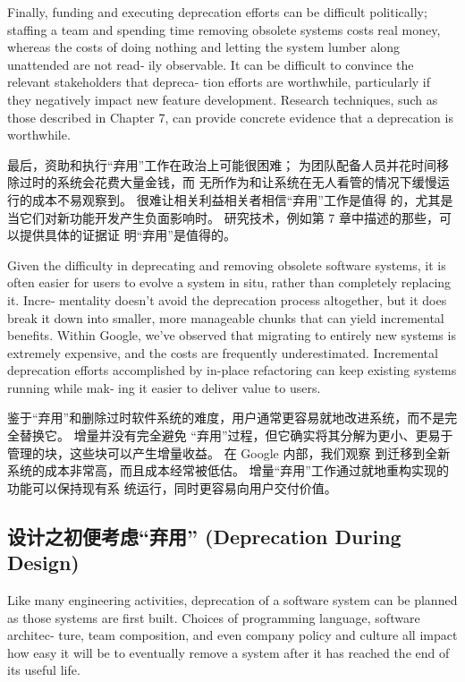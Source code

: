 \documentclass[10pt,a4paper,UTF8]{ctexart}
\begin{document}
Finally, funding and executing deprecation efforts can be difficult politically; staffing a team and
spending time removing obsolete systems costs real money, whereas the costs of doing nothing and
letting the system lumber along unattended are not read‐ ily observable. It can be difficult to
convince the relevant stakeholders that depreca‐ tion efforts are worthwhile, particularly if they
negatively impact new feature development. Research techniques, such as those described in Chapter
7, can provide concrete evidence that a deprecation is worthwhile.

最后，资助和执行“弃用”工作在政治上可能很困难； 为团队配备人员并花时间移除过时的系统会花费大量金钱，而
无所作为和让系统在无人看管的情况下缓慢运行的成本不易观察到。 很难让相关利益相关者相信“弃用”工作是值得
的，尤其是当它们对新功能开发产生负面影响时。 研究技术，例如第 7 章中描述的那些，可以提供具体的证据证
明“弃用”是值得的。

Given the difficulty in deprecating and removing obsolete software systems, it is often easier for
users to evolve a system in situ, rather than completely replacing it. Incre‐ mentality doesn’t
avoid the deprecation process altogether, but it does break it down into smaller, more manageable
chunks that can yield incremental benefits. Within Google, we’ve observed that migrating to entirely
new systems is extremely expensive, and the costs are frequently underestimated. Incremental
deprecation efforts accomplished by in-place refactoring can keep existing systems running while
mak‐ ing it easier to deliver value to users.

鉴于“弃用”和删除过时软件系统的难度，用户通常更容易就地改进系统，而不是完全替换它。 增量并没有完全避免
“弃用”过程，但它确实将其分解为更小、更易于管理的块，这些块可以产生增量收益。 在 Google 内部，我们观察
到迁移到全新系统的成本非常高，而且成本经常被低估。 增量“弃用”工作通过就地重构实现的功能可以保持现有系
统运行，同时更容易向用户交付价值。

\subsection{设计之初便考虑“弃用” (Deprecation During Design)}
\label{sec:org49c6970}

Like many engineering activities, deprecation of a software system can be planned as those systems
are first built. Choices of programming language, software architec‐ ture, team composition, and
even company policy and culture all impact how easy it will be to eventually remove a system after
it has reached the end of its useful life.
\end{document}
